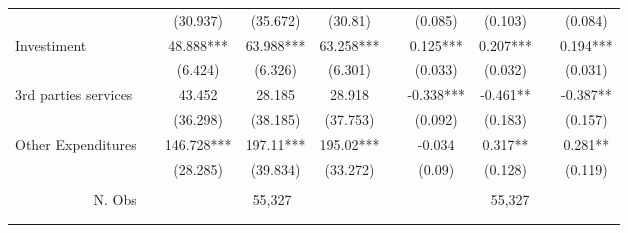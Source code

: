 \begin{table}[H]
\begin{footnotesize}
\begin{center}
{\begin{threeparttable}[b]
\begin{tabular}{rrcccrcccc}
          &       & (30.937) & (35.672) & (30.81) &       & (0.085) & (0.103) &       & (0.084) \\
    \multicolumn{1}{l}{\multirow{2}[0]{*}{Investiment}} &       & 48.888*** & 63.988*** & 63.258*** &       & 0.125*** & 0.207*** &       & 0.194*** \\
          &       & (6.424) & (6.326) & (6.301) &       & (0.033) & (0.032) &       & (0.031) \\
    \multicolumn{1}{l}{\multirow{2}[0]{*}{3rd parties services}} &       & 43.452 & 28.185 & 28.918 &       & -0.338*** & -0.461** &       & -0.387** \\
          &       & (36.298) & (38.185) & (37.753) &       & (0.092) & (0.183) &       & (0.157) \\
    \multicolumn{1}{l}{\multirow{2}[0]{*}{Other Expenditures}} &       & 146.728*** & 197.11*** & 195.02*** &       & -0.034 & 0.317** &       & 0.281** \\
          &       & (28.285) & (39.834) & (33.272) &       & (0.09) & (0.128) &       & (0.119) \\
          &       &       &       &       &       &       &       &       &  \\
    \multicolumn{1}{p{15.145em}}{N. Obs} &       & \multicolumn{3}{c}{55,327} &       & \multicolumn{4}{c}{55,327} \\
          &       &       &       &       &       &       &       &       &  \\
    \midrule
    \midrule
          &       &       &       &       &       &       &       &       &  \\
    \end{tabular}%
    
  \label{table:spending_siops}%

\end{threeparttable}
}
\end{center}
\end{footnotesize}
\end{table}
